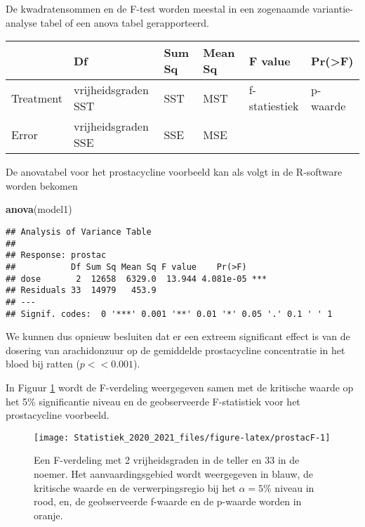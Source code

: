 \documentclass[
  12pt,dutch,coursenotes]{book}
\newenvironment{Shaded}{\begin{snugshade}}{\end{snugshade}}
\newcommand{\KeywordTok}[1]{\textcolor[rgb]{0.13,0.29,0.53}{\textbf{#1}}}
\newcommand{\NormalTok}[1]{#1}
\theoremstyle{definition}
\theoremstyle{definition}
\theoremstyle{definition}
\theoremstyle{remark}
\begin{document}
De kwadratensommen en de F-test worden meestal in een zogenaamde variantie-analyse tabel of een anova tabel gerapporteerd.

\begin{tabular}{l|l|l|l|l|l}
\hline
  & Df & Sum Sq & Mean Sq & F value & Pr(>F)\\
\hline
Treatment & vrijheidsgraden SST & SST & MST & f-statiestiek & p-waarde\\
\hline
Error & vrijheidsgraden SSE & SSE & MSE &  & \\
\hline
\end{tabular}

De anovatabel voor het prostacycline voorbeeld kan als volgt in de R-software worden bekomen

\begin{Shaded}
\begin{Highlighting}[]
\KeywordTok{anova}\NormalTok{(model1)}
\end{Highlighting}
\end{Shaded}

\begin{verbatim}
## Analysis of Variance Table
## 
## Response: prostac
##           Df Sum Sq Mean Sq F value    Pr(>F)    
## dose       2  12658  6329.0  13.944 4.081e-05 ***
## Residuals 33  14979   453.9                      
## ---
## Signif. codes:  0 '***' 0.001 '**' 0.01 '*' 0.05 '.' 0.1 ' ' 1
\end{verbatim}

We kunnen dus opnieuw besluiten dat er een extreem significant effect is van de dosering van arachidonzuur op de gemiddelde prostacycline concentratie in het bloed bij ratten (\(p<<0.001\)).

In Figuur \ref{fig:prostacF} wordt de F-verdeling weergegeven samen met de kritische waarde op het 5\% significantie niveau en de geobserveerde F-statistiek voor het prostacycline voorbeeld.\\

\begin{figure}

{\centering \texttt{[image: Statistiek\_2020\_2021\_files/figure-latex/prostacF-1]} 

}

\caption{Een F-verdeling met 2 vrijheidsgraden in de teller en 33 in de noemer. Het aanvaardingsgebied wordt weergegeven in blauw, de kritische waarde en de verwerpingsregio bij het $\alpha=5\%$ niveau in rood, en, de geobserveerde f-waarde  en de p-waarde worden in oranje.}\label{fig:prostacF}
\end{figure}
\end{document}
